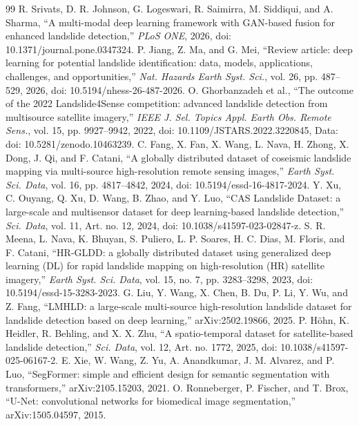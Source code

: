 \begin{thebibliography}{99}
 R. Srivats, D. R. Johnson, G. Logeswari, R. Saimirra, M. Siddiqui, and A. Sharma, ``A multi-modal deep learning framework with GAN-based fusion for enhanced landslide detection,'' \emph{PLoS ONE}, 2026, doi: 10.1371/journal.pone.0347324.
 P. Jiang, Z. Ma, and G. Mei, ``Review article: deep learning for potential landslide identification: data, models, applications, challenges, and opportunities,'' \emph{Nat. Hazards Earth Syst. Sci.}, vol. 26, pp. 487--529, 2026, doi: 10.5194/nhess-26-487-2026.
 O. Ghorbanzadeh et al., ``The outcome of the 2022 Landslide4Sense competition: advanced landslide detection from multisource satellite imagery,'' \emph{IEEE J. Sel. Topics Appl. Earth Obs. Remote Sens.}, vol. 15, pp. 9927--9942, 2022, doi: 10.1109/JSTARS.2022.3220845, Data: doi: 10.5281/zenodo.10463239.
 C. Fang, X. Fan, X. Wang, L. Nava, H. Zhong, X. Dong, J. Qi, and F. Catani, ``A globally distributed dataset of coseismic landslide mapping via multi-source high-resolution remote sensing images,'' \emph{Earth Syst. Sci. Data}, vol. 16, pp. 4817--4842, 2024, doi: 10.5194/essd-16-4817-2024.
 Y. Xu, C. Ouyang, Q. Xu, D. Wang, B. Zhao, and Y. Luo, ``CAS Landslide Dataset: a large-scale and multisensor dataset for deep learning-based landslide detection,'' \emph{Sci. Data}, vol. 11, Art. no. 12, 2024, doi: 10.1038/s41597-023-02847-z.
 S. R. Meena, L. Nava, K. Bhuyan, S. Puliero, L. P. Soares, H. C. Dias, M. Floris, and F. Catani, ``HR-GLDD: a globally distributed dataset using generalized deep learning (DL) for rapid landslide mapping on high-resolution (HR) satellite imagery,'' \emph{Earth Syst. Sci. Data}, vol. 15, no. 7, pp. 3283--3298, 2023, doi: 10.5194/essd-15-3283-2023.
 G. Liu, Y. Wang, X. Chen, B. Du, P. Li, Y. Wu, and Z. Fang, ``LMHLD: a large-scale multi-source high-resolution landslide dataset for landslide detection based on deep learning,'' arXiv:2502.19866, 2025.
 P. H\"ohn, K. Heidler, R. Behling, and X. X. Zhu, ``A spatio-temporal dataset for satellite-based landslide detection,'' \emph{Sci. Data}, vol. 12, Art. no. 1772, 2025, doi: 10.1038/s41597-025-06167-2.
 E. Xie, W. Wang, Z. Yu, A. Anandkumar, J. M. Alvarez, and P. Luo, ``SegFormer: simple and efficient design for semantic segmentation with transformers,'' arXiv:2105.15203, 2021.
 O. Ronneberger, P. Fischer, and T. Brox, ``U-Net: convolutional networks for biomedical image segmentation,'' arXiv:1505.04597, 2015.

\end{thebibliography}
